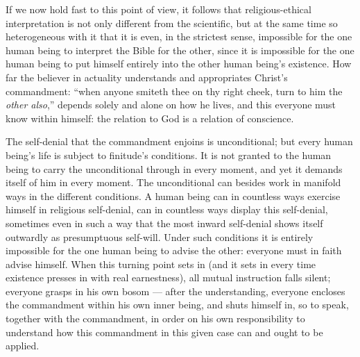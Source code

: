 \documentclass[12pt,a4paper]{book}
\begin{document}
If we now hold fast to this point of view, it follows that religious-ethical
interpretation is not only different from the scientific, but at the same time so
heterogeneous with it that it is even, in the strictest sense, impossible for the one
human being to interpret the Bible for the other, since it is impossible for the one
human being to put himself entirely into the other human being's existence. How far the
believer in actuality understands and appropriates Christ's commandment: ``when anyone
smiteth thee on thy right cheek, turn to him the \emph{other also},'' depends solely and
alone on how he lives, and this everyone must know within himself: the relation to God is
a relation of conscience.

The self-denial that the commandment enjoins is unconditional; but every human being's
life is subject to finitude's conditions. It is not granted to the human being to carry
the unconditional through in every moment, and yet it demands itself of him in every
moment. The unconditional can besides work in manifold ways in the different conditions.
A human being can in countless ways exercise himself in religious self-denial, can in
countless ways display this self-denial, sometimes even in such a way that the most
inward self-denial shows itself outwardly as presumptuous self-will. Under such
conditions it is entirely impossible for the one human being to advise the other:
everyone must in faith advise himself. When this turning point sets in (and it sets in
every time existence presses in with real earnestness), all mutual instruction falls
silent; everyone grasps in his own bosom --- after the understanding, everyone encloses
the commandment within his own inner being, and shuts himself in, so to speak, together
with the commandment, in order on his own responsibility to understand how this
commandment in this given case can and ought to be applied.
\end{document}
